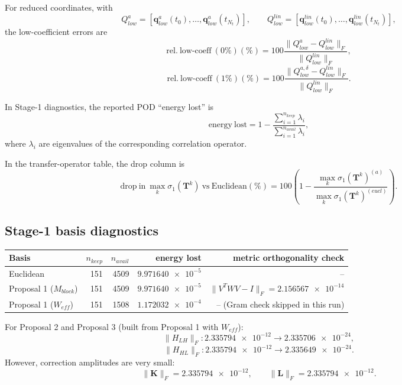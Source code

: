 \documentclass[11pt]{article}
\begin{document}
For reduced coordinates, with
\[
Q_{low}^{a}=[\mathbf q_{low}^{a}(t_0),\ldots,\mathbf q_{low}^{a}(t_{N_t})],
\qquad
Q_{low}^{lin}=[\mathbf q_{low}^{lin}(t_0),\ldots,\mathbf q_{low}^{lin}(t_{N_t})],
\]
the low-coefficient errors are
\[
\mathrm{rel.\ low\text{-}coeff\ (0\%)}(\%)
=
100\frac{\|Q_{low}^{a}-Q_{low}^{lin}\|_F}{\|Q_{low}^{lin}\|_F},
\]
\[
\mathrm{rel.\ low\text{-}coeff\ (1\%)}(\%)
=
100\frac{\|Q_{low}^{a,\delta}-Q_{low}^{lin}\|_F}{\|Q_{low}^{lin}\|_F}.
\]

In Stage-1 diagnostics, the reported POD ``energy lost'' is
\[
\mathrm{energy\ lost}
=
1-\frac{\sum_{i=1}^{n_{keep}}\lambda_i}{\sum_{i=1}^{n_{avail}}\lambda_i},
\]
where \(\lambda_i\) are eigenvalues of the corresponding correlation operator.

In the transfer-operator table, the drop column is
\[
\mathrm{drop\ in\ }\max_k\sigma_1(\mathbf T^k)\ \mathrm{vs\ Euclidean}(\%)
=
100\left(1-\frac{\max_k\sigma_1(\mathbf T^k)^{(a)}}{\max_k\sigma_1(\mathbf T^k)^{(eucl)}}\right).
\]

\subsection*{Stage-1 basis diagnostics}
\begin{longtable}{lrrrr}
\toprule
Basis & \(n_{keep}\) & \(n_{avail}\) & energy lost & metric orthogonality check \\
\midrule
Euclidean & 151 & 4509 & \(\num{9.971640e-5}\) & -- \\
Proposal 1 (\(M_{block}\)) & 151 & 4509 & \(\num{9.971640e-5}\) & \(\|V^T W V-I\|_F=\num{2.156567e-14}\) \\
Proposal 1 (\(W_{eff}\)) & 151 & 1508 & \(\num{1.172032e-4}\) & -- (Gram check skipped in this run) \\
\bottomrule
\end{longtable}

For Proposal 2 and Proposal 3 (built from Proposal 1 with \(W_{eff}\)):
\[
\|H_{LH}\|_F: \num{2.335794e-12}\rightarrow \num{2.335706e-24},
\]
\[
\|H_{HL}\|_F: \num{2.335794e-12}\rightarrow \num{2.335649e-24}.
\]
However, correction amplitudes are very small:
\[
\|\mathbf K\|_F=\num{2.335794e-12},
\qquad
\|\mathbf L\|_F=\num{2.335794e-12}.
\]
\end{document}
